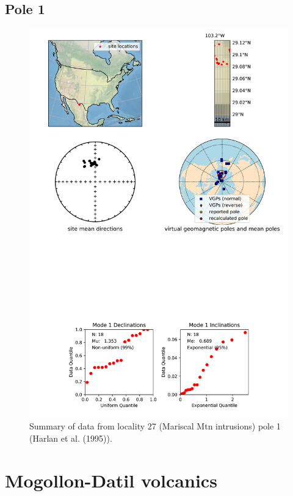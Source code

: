 \documentclass{article}
\begin{document}
\subsection{Pole 1}


\begin{figure}[H]
\centering
\includegraphics[width=5 in]{./27/1/pole_summary.png}
\caption{Summary of data from locality 27 (Mariscal Mtn intrusions) pole 1 (Harlan et al. (1995)).}
\end{figure}

\section{Mogollon-Datil volcanics}
\end{document}
